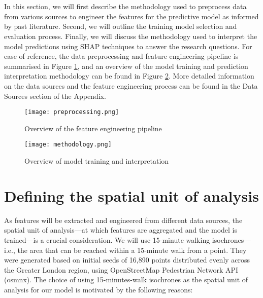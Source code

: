 \section*{}

In this section, we will first describe the methodology used to preprocess data from various sources to engineer the features for the predictive model as informed by past literature. Second, we will outline the training model selection and evaluation process. Finally, we will discuss the methodology used to interpret the model predictions using SHAP techniques to answer the research questions. For ease of reference, the data preprocessing and feature engineering pipeline is summarised in Figure \ref{fig:preprocessing}, and an overview of the model training and prediction interpretation methodology can be found in Figure \ref{fig:methodology}. More detailed information on the data sources and the feature engineering process can be found in the Data Sources section of the Appendix.

\begin{figure}[!ht]
    \centering
    \texttt{[image: preprocessing.png]}
    \caption{Overview of the feature engineering pipeline}
    \label{fig:preprocessing}
\end{figure}

\begin{figure}[!ht]
    \centering
    \texttt{[image: methodology.png]}
    \caption{Overview of model training and interpretation}
    \label{fig:methodology}
\end{figure}

\pagebreak %
\section{Defining the spatial unit of analysis}

As features will be extracted and engineered from different data sources, the spatial unit of analysis---at which features are aggregated and the model is trained---is a crucial consideration. We will use 15-minute walking isochrones---i.e., the area that can be reached within a 15-minute walk from a point. They were generated based on initial seeds of 16,890 points distributed evenly across the Greater London region, using OpenStreetMap Pedestrian Network API (osmnx). The choice of using 15-minutes-walk isochrones as the spatial unit of analysis for our model is motivated by the following reasons: 

